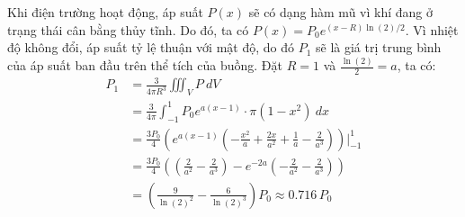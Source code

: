 
\begin{solution}
Khi điện trường hoạt động, áp suất $P(x)$ sẽ có dạng hàm mũ vì khí đang ở trạng thái cân bằng thủy tĩnh. Do đó, ta có $P(x) = P_0 e^{(x-R)\ln(2)/2}$. Vì nhiệt độ không đổi, áp suất tỷ lệ thuận với mật độ, do đó $P_1$ sẽ là giá trị trung bình của áp suất ban đầu trên thể tích của buồng. Đặt $R=1$ và $\displaystyle\frac{\ln(2)}{2} = a$, ta có:
\begin{align*}
P_{1} &= \frac{3}{4\pi R^3}\iiint_{V}P\ dV\\
&= \frac{3}{4\pi }\int_{-1}^{1}P_{0}e^{a(x-1)}\cdot \pi(1-x^{2})\ dx\\
&= \frac{3P_{0}}{4}\left(e^{a(x-1)}\left(-\frac{x^{2}}{a} + \frac{2x}{a^{2}} + \frac{1}{a} - \frac{2}{a^3}\right)\right)\bigg\vert_{-1}^1\\
&= \frac{3P_0}{4}\left(\left(\frac{2}{a^2}-\frac{2}{a^3}\right)-e^{-2a}\left(-\frac{2}{a^2} -\frac{2}{a^3}\right)\right)\\
&= \boxed{\left(\frac{9}{\ln(2)^{2}} - \frac{6}{\ln(2)^{3}}\right)P_0}\approx 0.716\,P_0
\end{align*}
\end{solution}
